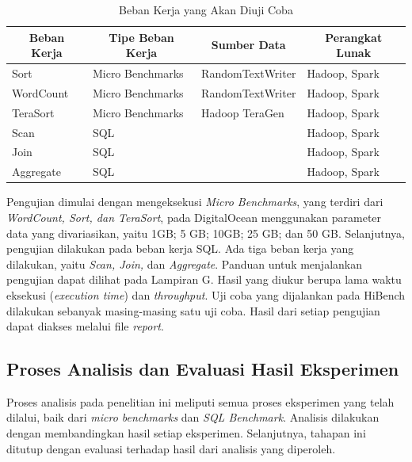 \begin{table}[h!]
\centering
\caption{Beban Kerja yang Akan Diuji Coba}
\begin{tabular}{|l|l|l|l|}
\hline
\multicolumn{1}{|c|}{\textbf{Beban Kerja}} & \multicolumn{1}{c|}{\textbf{Tipe Beban Kerja}} & \multicolumn{1}{c|}{\textbf{Sumber Data}} & \multicolumn{1}{c|}{\textbf{Perangkat Lunak}} \\ \hline
Sort & Micro Benchmarks & RandomTextWriter & Hadoop, Spark \\ \hline
WordCount & Micro Benchmarks & RandomTextWriter & Hadoop, Spark \\ \hline
TeraSort & Micro Benchmarks & Hadoop TeraGen & Hadoop, Spark \\ \hline
Scan & SQL & \cite{pavloComparisonApproachesLargescale2009} & Hadoop, Spark \\ \hline
Join & SQL & \cite{pavloComparisonApproachesLargescale2009}  & Hadoop, Spark \\ \hline
Aggregate & SQL & \cite{pavloComparisonApproachesLargescale2009}  & Hadoop, Spark \\ \hline
\end{tabular}
\label{table:workload}
\end{table}

Pengujian dimulai dengan mengeksekusi \textit{Micro Benchmarks}, yang terdiri dari \textit{WordCount, Sort, dan TeraSort}, pada DigitalOcean menggunakan parameter data yang divariasikan, yaitu {1GB; 5 GB; 10GB; 25 GB; dan 50 GB}. Selanjutnya, pengujian dilakukan pada beban kerja SQL. Ada tiga beban kerja yang dilakukan, yaitu \textit{Scan, Join,} dan \textit{Aggregate}. Panduan untuk menjalankan pengujian dapat dilihat pada Lampiran G. Hasil yang diukur berupa lama waktu eksekusi (\textit{execution time}) dan \textit{throughput}. Uji coba yang dijalankan pada HiBench dilakukan sebanyak masing-masing satu uji coba. Hasil dari setiap pengujian dapat diakses melalui file \textit{report}.

\subsection{Proses Analisis dan Evaluasi Hasil Eksperimen}
Proses analisis pada penelitian ini meliputi semua proses eksperimen yang telah dilalui, baik dari \textit{micro benchmarks} dan \textit{SQL Benchmark}. Analisis dilakukan dengan membandingkan hasil setiap eksperimen. Selanjutnya, tahapan ini ditutup dengan evaluasi terhadap hasil dari analisis yang diperoleh.








